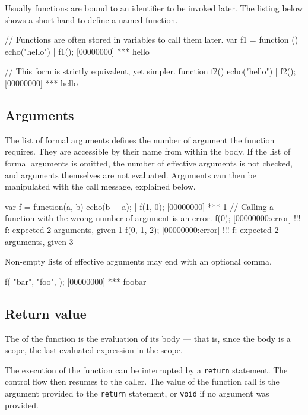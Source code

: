 Usually functions are bound to an identifier to be invoked later.  The
listing below shows a short-hand to define a named function.

\begin{urbiscript}
// Functions are often stored in variables to call them later.
var f1 = function () {
  echo("hello")
}|
f1();
[00000000] *** hello

// This form is strictly equivalent, yet simpler.
function f2()
{
  echo("hello")
}|
f2();
[00000000] *** hello
\end{urbiscript}


\subsection{Arguments}

The list of formal arguments defines the number of argument the
function requires. They are accessible by their name from within the
body. If the list of formal arguments is omitted, the number of
effective arguments is not checked, and arguments themselves are not
evaluated. Arguments can then be manipulated with the call message,
explained below.

\begin{urbiscript}
var f = function(a, b) {
  echo(b + a);
}|
f(1, 0);
[00000000] *** 1
// Calling a function with the wrong number of argument is an error.
f(0);
[00000000:error] !!! f: expected 2 arguments, given 1
f(0, 1, 2);
[00000000:error] !!! f: expected 2 arguments, given 3
\end{urbiscript}

Non-empty lists of effective arguments may end with an optional comma.
\begin{urbiscript}
f(
  "bar",
  "foo",
 );
[00000000] *** foobar
\end{urbiscript}


\subsection{Return value}
\label{sec:lang:rv}
The  of the function is the
evaluation of its body --- that is, since the body is a scope, the last
evaluated expression in the scope.

The execution of the function can be interrupted by a \lstinline{return}
statement.  The control flow then resumes to the caller.  The value of the
function call is the argument provided to the \lstinline{return} statement,
or \lstinline{void} if no argument was provided.

